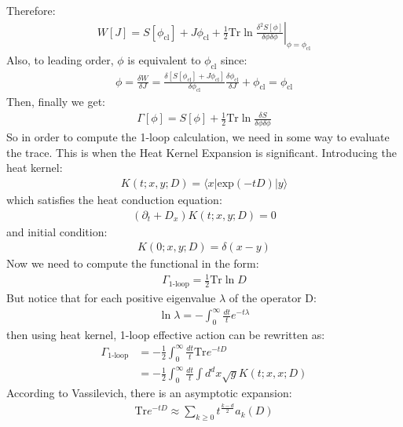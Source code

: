 \documentclass[fleqn]{article}
\begin{document}
Therefore:
\begin{align}
W[J] = S[\phi_{\text{cl}}] +J\phi_{\text{cl}} + \left. \frac{1}{2} \text{Tr} \ln \frac{\delta ^{2} S[\phi]}{\delta \phi \delta \phi} \right|_{\phi = \phi_{\text{cl}}}
\end{align}
Also, to leading order, $\phi$ is equivalent to $\phi _{\text{cl}}$ since:
\begin{align}
\phi = \frac{\delta W}{\delta J} = \frac{\delta [S[\phi_{\text{cl}}] + J\phi_{\text{cl}}]} {\delta \phi _{\text{cl}}}\frac{\delta \phi _{\text{cl}}}{\delta J} + \phi _{\text{cl}} = \phi _{\text{cl}}
\end{align}
Then, finally we get:
\begin{align}
\Gamma [\phi] = S[\phi] + \frac{1}{2} \text{Tr}\ln \frac{\delta S}{\delta \phi \delta \phi}
\end{align}
So in order to compute the 1-loop calculation, we need in some way to evaluate the trace. This is when the Heat Kernel Expansion is significant. Introducing the heat kernel:
\begin{align}
K(t;x,y;D) = \langle x | \text{exp} (-tD) | y \rangle
\end{align}
which satisfies the heat conduction equation:
\begin{align}
(\partial _{t} + D_{x})K(t;x,y;D) =0
\end{align}
and initial condition:
\begin{align}
K(0;x,y;D) = \delta(x-y)
\end{align}
Now we need to compute the functional in the form:
\begin{align}
\Gamma_{\text{1-loop}} = \frac{1}{2} \text{Tr} \ln D
\end{align}
But notice that for each positive eigenvalue $\lambda$ of the operator D:
\begin{align}
\ln \lambda = -\int _{0}^{\infty} \frac{dt}{t} e^{-t\lambda}
\end{align}
then using heat kernel, 1-loop effective action can be rewritten as:
\begin{align}
\Gamma _{\text{1-loop}} &= -\frac{1}{2} \int _{0}^{\infty} \frac{dt}{t} \text{Tr} e^{-tD} \nonumber \\
&= -\frac{1}{2} \int _{0}^{\infty} \frac{dt}{t} \int d^{d}x \sqrt{g} K(t;x,x;D)
\end{align}
According to Vassilevich, there is an asymptotic expansion:
\begin{align}
\text{Tr} e^{-tD} \approx \sum_{k\geq0} t^{\frac{k-d}{2}}a_{k}(D)
\end{align}
\end{document}
